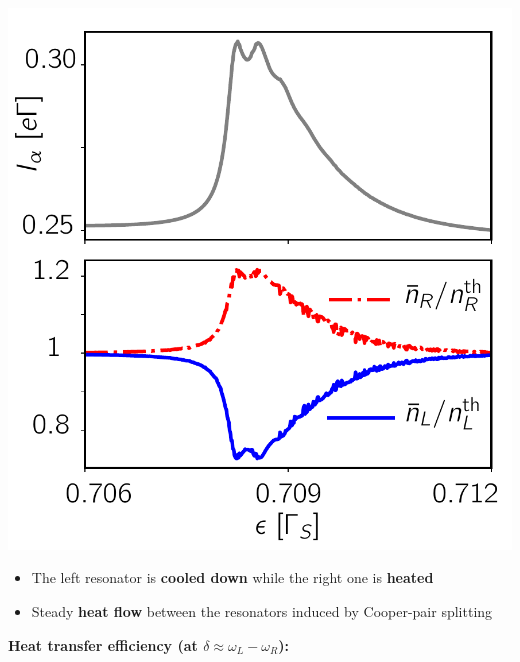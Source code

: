 \documentclass[rgb]{article}
\newcommand{\bluebf}[1]{\textcolor{seeblau100}{\textbf{#1}}}
\newcommand{\orangebf}[1]{\textcolor{amber}{\textbf{#1}}}
\newcommand{\redbf}[1]{\textcolor{alizarin}{\textbf{#1}}}
\begin{document}
{{\begin{center}
			\includegraphics[]{Fig4/Fig4}\\[1ex]
		\end{center}
	\begin{itemize}
		\item The left resonator is \bluebf{cooled down} while the right one 
		is 
		\redbf{heated}
		\item Steady \orangebf{heat flow} between the resonators induced by 
		Cooper-pair splitting
	\end{itemize}
	}
	{\textbf{Heat transfer efficiency (at $\delta \approx \omega_L - 
	\omega_R$):\\[1ex]}
	
}}
\end{document}
